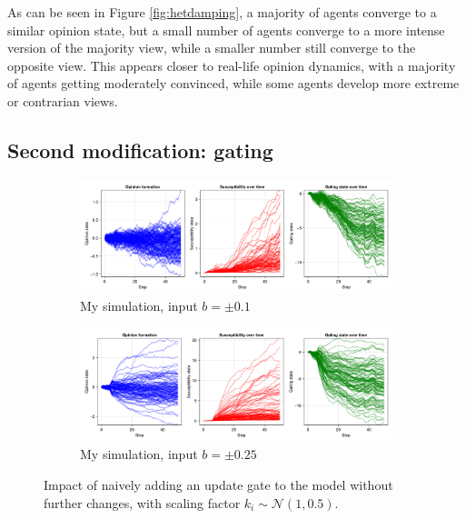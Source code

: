 \documentclass[]{article}
\begin{document}
As can be seen in Figure \ref{fig:hetdamping}, a majority of agents converge to a similar opinion state, but a small number of agents converge to a more intense version of the majority view, while a smaller number still converge to the opposite view. This appears closer to real-life opinion dynamics, with a majority of agents getting moderately convinced, while some agents develop more extreme or contrarian views.

\subsection{Second modification: gating}

\begin{figure}
	\centering
	\begin{subfigure}[t]{0.75\textwidth}
		\centering
		\includegraphics[width=\textwidth]{../plots/wg_hetd_lowsig.png} 
		\caption{My simulation, input $b = \pm 0.1 $} \label{fig:gating1}
	\end{subfigure}
	
	\begin{subfigure}[t]{0.75\textwidth}
		\centering
		\includegraphics[width=\textwidth]{../plots/wg_hetd_medsig.png} 
		\caption{My simulation, input $b = \pm 0.25 $} \label{fig:gating2}
	\end{subfigure}
	
	\caption{Impact of naively adding an update gate to the model without further changes, with scaling factor $k_i \sim \mathcal{N}(1,0.5)$.}\label{fig:gatingintro}
\end{figure}
\end{document}
